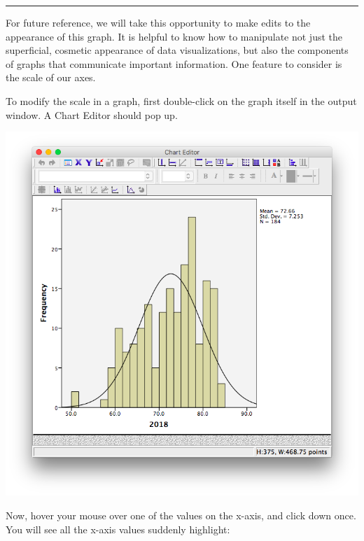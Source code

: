 \documentclass[
]{book}
\begin{document}
\begin{center}\rule{0.5\linewidth}{0.5pt}\end{center}

For future reference, we will take this opportunity to make edits to the appearance of this graph. It is helpful to know how to manipulate not just the superficial, cosmetic appearance of data visualizations, but also the components of graphs that communicate important information. One feature to consider is the scale of our axes.

To modify the scale in a graph, first {double-click} on the graph itself in the output window. A Chart Editor should pop up.

\includegraphics{img/2.4.23.png}

Now, hover your mouse over one of the values on the x-axis, and click down once. You will see all the x-axis values suddenly highlight:
\end{document}
